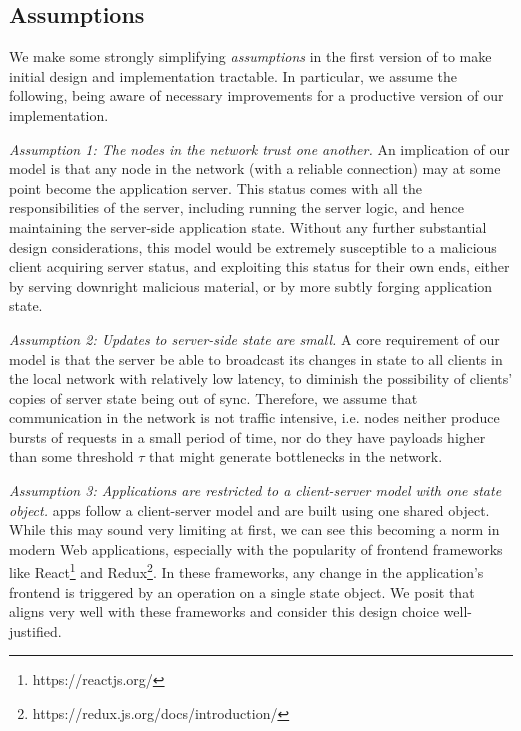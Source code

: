 \subsection{Assumptions}
\label{sub:assumptions}

We make some strongly simplifying \textit{assumptions} in the first version of \APIName to make initial design and implementation tractable. In particular, we assume the following, being aware of necessary improvements for a productive version of our implementation.

\textit{Assumption 1: The nodes in the network trust one another.}
An implication of our model is that any node in the network (with a reliable connection) may at some point become the application server.
This status comes with all the responsibilities of the server, including running the server logic, and hence maintaining the server-side application state.
Without any further substantial design considerations, this model would be extremely susceptible to a malicious client acquiring server status, and exploiting this status for their own ends, either by serving downright malicious material, or by more subtly forging application state.

\textit{Assumption 2: Updates to server-side state are small.}
A core requirement of our model is that the server be able to broadcast its changes in state to all clients in the local network with relatively low latency, to diminish the possibility of clients' copies of server state being out of sync.
Therefore, we assume that communication in the network is not traffic intensive, i.e. nodes neither produce bursts of requests in a small period of time, nor do they have payloads higher than some threshold $\tau$ that might generate bottlenecks in the network.

\textit{Assumption 3: Applications are restricted to a client-server model with one state object.}
\APIName apps follow a client-server model and are built using one shared object. While this may sound very limiting at first, we can see this becoming a norm in modern Web applications, especially with the popularity of frontend frameworks like React\footnote{https://reactjs.org/} and Redux\footnote{https://redux.js.org/docs/introduction/}. In these frameworks, any change in the application's frontend is triggered by an operation on a single state object. We posit that \APIName aligns very well with these frameworks and consider this design choice well-justified.